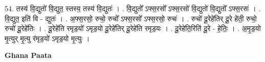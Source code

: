 \documentclass[17pt]{extarticle}
\begin{document}
54. तस्य॑ वि॒द्युतो॑ वि॒द्युत॒ स्तस्य॒ तस्य॑ वि॒द्युतः॑ । . वि॒द्युतो᳚ ऽफ्स॒रसो᳚ ऽफ्स॒रसो॑ वि॒द्युतो॑ वि॒द्युतो᳚ ऽफ्स॒रसः॑ । . वि॒द्युत॒ इति॑ वि - द्युतः॑ । . अ॒फ्स॒रसो॒ रुचो॒ रुचो᳚ ऽफ्स॒रसो᳚ ऽफ्स॒रसो॒ रुचः॑ । . रुचो॑ दू॒रेहे॑तिर् दू॒रे हे॑ती॒ रुचो॒ रुचो॑ दू॒रेहे॑तिः । . दू॒रेहे॑ति रमृड॒यो॑ ऽमृड॒यो दू॒रेहे॑तिर् दू॒रेहे॑ति रमृड॒यः । . दू॒रेहे॑ति॒रिति॑ दू॒रे - हे॒तिः॒ । . अ॒मृ॒ड॒यो मृ॒त्युर् मृ॒त्यु र॑मृड॒यो॑ ऽमृड॒यो मृ॒त्युः । \newline

\textbf{Ghana Paata } \newline
\end{document}
